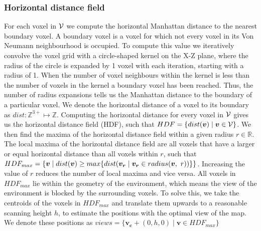 \subsubsection{Horizontal distance field}
For each voxel in \(\mathcal{V}\) we compute the horizontal Manhattan distance to the nearest boundary voxel. A boundary voxel is a voxel for which not every voxel in its Von Neumann neighbourhood is occupied. To compute this value we iteratively convolve the voxel grid with a circle-shaped kernel on the X-Z plane, where the radius of the circle is expanded by 1 voxel with each iteration, starting with a radius of 1. When the number of voxel neighbours within the kernel is less than the number of voxels in the kernel a boundary voxel has been reached. Thus, the number of radius expansions tells us the Manhattan distance to the boundary of a particular voxel. We denote the horizontal distance of a voxel to its boundary as \(dist: \mathbb{Z}^{3+} \mapsto \mathbb{Z}\). Computing the horizontal distance for every voxel in \(\mathcal{V}\) gives us the horizontal distance field (HDF), such that \(HDF = \{dist(\boldsymbol{v}) \mid \boldsymbol{v} \in \mathcal{V}\}\). We then find the maxima of the horizontal distance field within a given radius \(r \in \mathbb{R}\).  The local maxima of the horizontal distance field are all voxels that have a larger or equal horizontal distance than all voxels within \(r\), such that \(HDF_{max} = \{\boldsymbol{v} \mid dist(\boldsymbol{v}) \geq max \{dist(\boldsymbol{v_{r}} \mid \boldsymbol{v_{r}} \in radius(\boldsymbol{v},\ r))\}\}\). Increasing the value of \(r\) reduces the number of local maxima and vice versa. All voxels in \(HDF_{max}\) lie within the geometry of the environment, which means the view of the environment is blocked by the surrounding voxels. To solve this, we take the centroids of the voxels in \(HDF_{max}\) and translate them upwards to a reasonable scanning height \(h\), to estimate the positions with the optimal view of the map. We denote these positions as \(views = \{\boldsymbol{v_c} + (0, h, 0) \mid \boldsymbol{v} \in HDF_{max}\}\)

